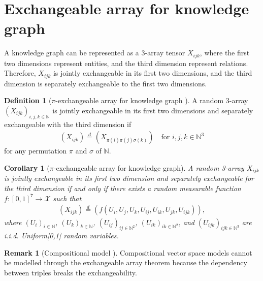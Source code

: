 \documentclass{article}
\newtheorem{corollary}{Corollary}[theorem] %
\theoremstyle{definition}
\newtheorem{definition}{Definition}
\newtheorem{remark}{Remark}
\begin{document}
\section{Exchangeable array for knowledge graph}

A knowledge graph can be represented as a 3-array tensor $X_{ijk}$, where the first two dimensions represent entities, and the third dimension represent relations. Therefore, $X_{ijk}$ is jointly exchangeable in its first two dimensions, and the third dimension is separately exchangeable to the first two dimensions.

\begin{definition}[$\pi$-exchangeable array for knowledge graph \cite{Orbanz2015}]A random 3-array $(X_{ijk})_{i,j,k\in \mathbb{N}}$ is jointly exchangeable in its first two dimensions and separately exchangeable with the third dimension if
\begin{align}
(X_{ijk}) \stackrel{d}{=} (X_{\pi(i)\pi(j)\sigma(k)}) \quad \text{for } i,j,k \in \mathbb{N}^3
\end{align}
for any permutation $\pi$ and $\sigma$ of $\mathbb{N}$.
\end{definition}


\begin{corollary}[$\pi$-exchangeable array for knowledge graph]
A random 3-array $X_{ijk}$ is jointly exchangeable in its first two dimension and separately exchangeable for the third dimension if and only if there exists a random measurable function $f:[0,1]^7 \rightarrow \mathcal{X}$ such that
\begin{align}
(X_{ijk})  \stackrel{d}{=} (f(U_i, U_j, U_k, U_{ij}, U_{ik}, U_{jk}, U_{ijk})),
\end{align}
where $(U_i)_{i\in \mathbb{N}}$, $(U_k)_{k\in \mathbb{N}}$, $(U_{ij})_{ij\in \mathbb{N}^2}$, $(U_{ik})_{ik\in \mathbb{N}^2}$, and $(U_{ijk})_{ijk\in \mathbb{N}^3}$  are i.i.d. Uniform[0,1] random variables.
\end{corollary}

\begin{remark}[Compositional model \cite{gu2015traversing}] Compositional vector space models cannot be modelled through the exchangeable array theorem because the dependency between triples breaks the exchangeability.
\end{remark}
\end{document}
